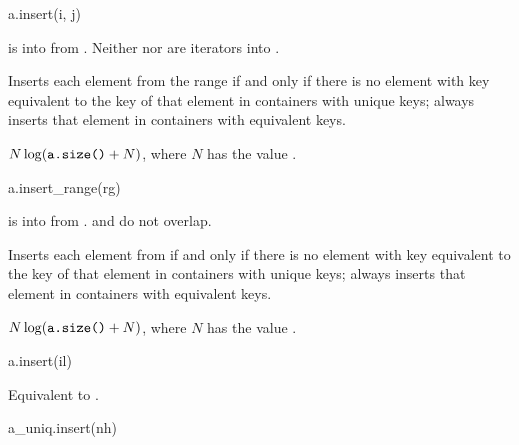%
\begin{itemdecl}
a.insert(i, j)
\end{itemdecl}

\begin{itemdescr}
\pnum
\result
{}

\pnum
\expects
{} is
 into  from .
Neither  nor  are iterators into .

\pnum
\effects
Inserts each element from the range 
if and only if there is no element
with key equivalent to the key of that element in containers with unique keys;
always inserts that element in containers with equivalent keys.

\pnum
\complexity
$N \log (\tcode{a.size()} + N)$, where $N$ has the value .
\end{itemdescr}

%
\begin{itemdecl}
a.insert_range(rg)
\end{itemdecl}

\begin{itemdescr}
\pnum
\result
{}

\pnum
\expects
{} is
 into 
from .
 and  do not overlap.

\pnum
\effects
Inserts each element from  if and only if
there is no element with key equivalent to the key of that element
in containers with unique keys;
always inserts that element in containers with equivalent keys.

\pnum
\complexity
$N \log (\tcode{a.size()} + N)$,
where $N$ has the value .
\end{itemdescr}

%
\begin{itemdecl}
a.insert(il)
\end{itemdecl}

\begin{itemdescr}
\pnum
\effects
Equivalent to .
\end{itemdescr}

%
\begin{itemdecl}
a_uniq.insert(nh)
\end{itemdecl}

